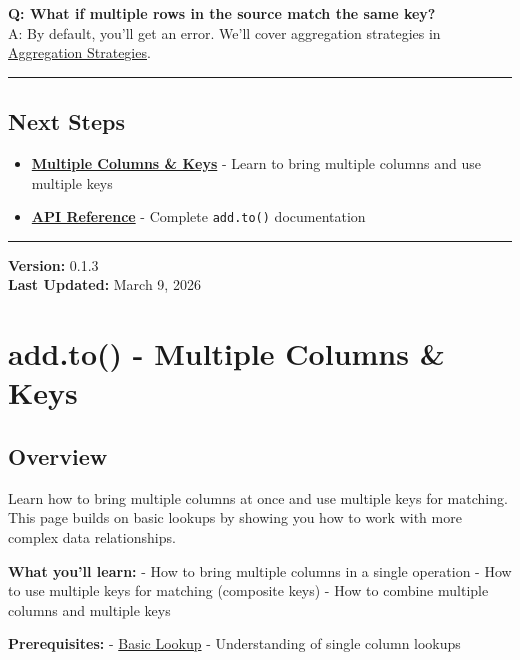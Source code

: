 \documentclass[
  letterpaper,
]{scrbook}
\providecommand{\tightlist}{%
  \setlength{\itemsep}{0pt}\setlength{\parskip}{0pt}}
\begin{document}
\textbf{Q: What if multiple rows in the source match the same key?}\\
A: By default, you'll get an error. We'll cover aggregation strategies
in \href{examples-to-04-strategy.html}{Aggregation Strategies}.

\begin{center}\rule{0.5\linewidth}{0.5pt}\end{center}

\section{Next Steps}\label{next-steps-2}

\begin{itemize}
\tightlist
\item
  \textbf{\href{examples-to-02-multiple.html}{Multiple Columns \& Keys}}
  - Learn to bring multiple columns and use multiple keys
\item
  \textbf{\href{reference-to-basic.html}{API Reference}} - Complete
  \texttt{add.to()} documentation
\end{itemize}

\begin{center}\rule{0.5\linewidth}{0.5pt}\end{center}

\textbf{Version:} 0.1.3\\
\textbf{Last Updated:} March 9, 2026

\chapter{add.to() - Multiple Columns \&
Keys}\label{add.to---multiple-columns-keys}

\section{Overview}\label{overview-1}

Learn how to bring multiple columns at once and use multiple keys for
matching. This page builds on basic lookups by showing you how to work
with more complex data relationships.

\textbf{What you'll learn:} - How to bring multiple columns in a single
operation - How to use multiple keys for matching (composite keys) - How
to combine multiple columns and multiple keys

\textbf{Prerequisites:} - \href{examples-to-01-basic.html}{Basic Lookup}
- Understanding of single column lookups
\end{document}
